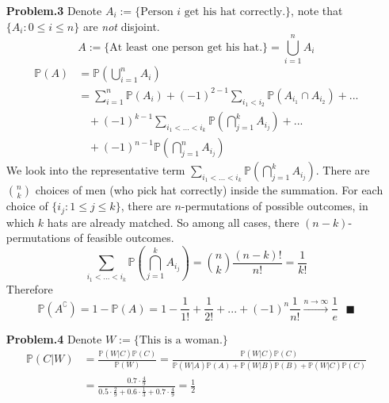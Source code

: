 \documentclass[a4paper, 11pt]{article}
\begin{document}
\begin{itemize}
	\item[\textbf{Problem.3}] Denote $A_i:=\{\text{Person $i$ get his hat correctly.}\}$, note that $\{A_i: 0\leq i\leq n\}$ are \textit{not} disjoint. 
	$$A:=\{\text{At least one person get his hat.}\}=\bigcup_{i=1}^{n} A_i$$
	\begin{equation}
		\begin{split}
			\mathbb{P}\left(A\right)&= \mathbb{P}\left(\bigcup_{i=1}^{n}A_i\right)\\
			&=\sum_{i=1}^n \mathbb{P}\left(A_i\right)+(-1)^{2-1}\sum_{i_1< i_2} \mathbb{P}\left(A_{i_1}\cap A_{i_2}\right)+...\\
			&~~~~+(-1)^{k-1} \sum_{i_1<...<i_k}\mathbb{P}\left(\bigcap_{j=1}^{k} A_{i_j}\right)+...\\
			&~~~~+(-1)^{n-1} \mathbb{P}\left(\bigcap_{j=1}^{n} A_{i_j}\right)
		\end{split}
	\end{equation}
	We look into the representative term $\sum_{i_1<...<i_k}\mathbb{P}\left(\bigcap_{j=1}^{k} A_{i_j}\right)$. There are $\binom{n}{k}$ choices of men (who pick hat correctly) inside the summation. For each choice of $\{i_j: 1\leq j\leq k\}$, there are $n$-permutations of possible outcomes, in which $k$ hats are already matched. So among all cases, there $(n-k)$-permutations of feasible outcomes.
	$$\sum_{i_1<...<i_k}\mathbb{P}\left(\bigcap_{j=1}^{k} A_{i_j}\right)=\binom{n}{k}\frac{(n-k)!}{n!}=\frac{1}{k!}$$
	Therefore
	$$\mathbb{P}\left(A^{\complement}\right)=1- \mathbb{P}\left(A\right)=1-\frac{1}{1!}+\frac{1}{2!}+...+(-1)^n\frac{1}{n!}\xrightarrow{n\to \infty}\frac{1}{e}~~~\blacksquare$$
\end{itemize}

\begin{itemize}
	\item[\textbf{Problem.4}] Denote $W:=\{\text{This is a woman.}\}$
	\begin{equation}
		\begin{split}
			\mathbb{P}\left(C|W\right)&=\frac{\mathbb{P}\left(W|C\right)\mathbb{P}\left(C\right)}{\mathbb{P}\left(W\right)}=\frac{\mathbb{P}\left(W|C\right)\mathbb{P}\left(C\right)}{\mathbb{P}\left(W|A\right)\mathbb{P}\left(A\right)+\mathbb{P}\left(W|B\right)\mathbb{P}\left(B\right)+\mathbb{P}\left(W|C\right)\mathbb{P}\left(C\right)}\\
			&=\frac{0.7\cdot \frac{4}{9}}{0.5\cdot \frac{2}{9}+0.6\cdot \frac{1}{3}+0.7\cdot \frac{4}{9}}=\frac{1}{2}
		\end{split}
	\end{equation}
\end{itemize}
\end{document}
